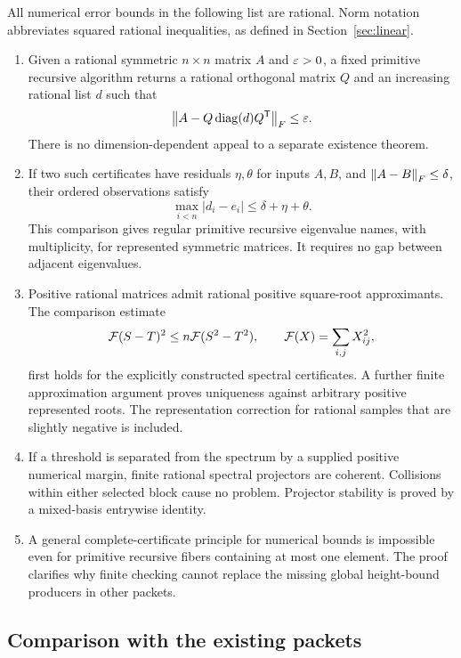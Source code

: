 All numerical error bounds in the following list are rational. Norm notation abbreviates squared rational inequalities, as defined in Section~\ref{sec:linear}.
\begin{enumerate}
\item Given a rational symmetric $n\times n$ matrix $A$ and $\varepsilon>0$, a fixed primitive recursive algorithm returns a rational orthogonal matrix $Q$ and an increasing rational list $d$ such that
\[
 \left\lVert A-Q\operatorname{diag}(d)Q^{\mathsf T}\right\rVert_F\le\varepsilon.
\]
There is no dimension-dependent appeal to a separate existence theorem.
\item If two such certificates have residuals $\eta,\theta$ for inputs $A,B$, and $\left\lVert A-B\right\rVert_F\le\delta$, their ordered observations satisfy
\[
 \max_{i<n}|d_i-e_i|\le\delta+\eta+\theta.
\]
This comparison gives regular primitive recursive eigenvalue names, with multiplicity, for represented symmetric matrices. It requires no gap between adjacent eigenvalues.
\item Positive rational matrices admit rational positive square-root approximants. The comparison estimate
\[
 \mathcal F(S-T)^2\le n\mathcal F(S^2-T^2),\qquad
 \mathcal F(X)=\sum_{i,j}X_{ij}^2,
\]
first holds for the explicitly constructed spectral certificates. A further finite approximation argument proves uniqueness against arbitrary positive represented roots. The representation correction for rational samples that are slightly negative is included.
\item If a threshold is separated from the spectrum by a supplied positive numerical margin, finite rational spectral projectors are coherent. Collisions within either selected block cause no problem. Projector stability is proved by a mixed-basis entrywise identity.
\item A general complete-certificate principle for numerical bounds is impossible even for primitive recursive fibers containing at most one element. The proof clarifies why finite checking cannot replace the missing global height-bound producers in other packets.
\end{enumerate}

\subsection{Comparison with the existing packets}

